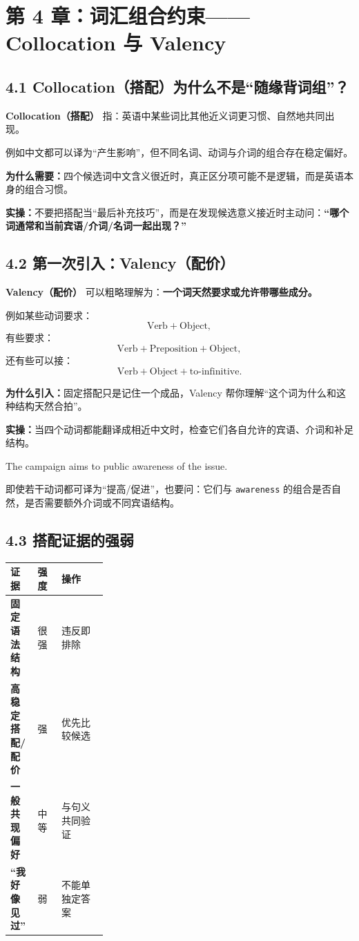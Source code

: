 \documentclass[11pt,a4paper]{ctexart}
\newcommand{\kw}[1]{\textbf{#1}}
\newcommand{\term}[2]{\textbf{#1（#2）}}
\begin{document}
\section{第 4 章：词汇组合约束——Collocation 与 Valency}

\subsection{4.1 Collocation（搭配）为什么不是“随缘背词组”？}
\term{Collocation}{搭配} 指：英语中某些词比其他近义词更习惯、自然地共同出现。

例如中文都可以译为“产生影响”，但不同名词、动词与介词的组合存在稳定偏好。

\kw{为什么需要：}四个候选词中文含义很近时，真正区分项可能不是逻辑，而是英语本身的组合习惯。

\kw{实操：}不要把搭配当“最后补充技巧”，而是在发现候选意义接近时主动问：\kw{“哪个词通常和当前宾语/介词/名词一起出现？”}

\subsection{4.2 第一次引入：Valency（配价）}
\term{Valency}{配价} 可以粗略理解为：\kw{一个词天然要求或允许带哪些成分。}

例如某些动词要求：
\[
\text{Verb}+\text{Object},
\]
有些要求：
\[
\text{Verb}+\text{Preposition}+\text{Object},
\]
还有些可以接：
\[
\text{Verb}+\text{Object}+\text{to-infinitive}.
\]

\kw{为什么引入：}固定搭配只是记住一个成品，Valency 帮你理解“这个词为什么和这种结构天然合拍”。

\kw{实操：}当四个动词都能翻译成相近中文时，检查它们各自允许的宾语、介词和补足结构。

\begin{eng}[例 3：搭配与配价比中文释义更硬]
The campaign aims to \underline{\hspace{1.2cm}} public awareness of the issue.

即使若干动词都可译为“提高/促进”，也要问：它们与 \texttt{awareness} 的组合是否自然，是否需要额外介词或不同宾语结构。
\end{eng}

\subsection{4.3 搭配证据的强弱}
\begin{center}
\small
\begin{tabularx}{\linewidth}{>{\bfseries}p{0.28\linewidth} X X}
\toprule
证据 & 强度 & 操作 \\
\midrule
固定语法结构 & 很强 & 违反即排除 \\
高稳定搭配/配价 & 强 & 优先比较候选 \\
一般共现偏好 & 中等 & 与句义共同验证 \\
“我好像见过” & 弱 & 不能单独定答案 \\
\bottomrule
\end{tabularx}
\end{center}
\end{document}
